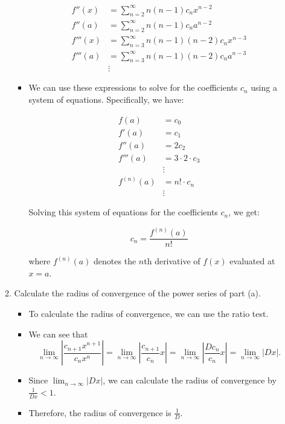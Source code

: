 \documentclass[12pt]{article}
\begin{document}
\begin{enumerate}[leftmargin=\labelsep]
\begin{enumerate}
\begin{itemize}[label={}]
            \begin{align*}
            f''(x) &= \sum_{n=2}^{\infty} n(n-1) c_n x^{n-2} \\
            f''(a) &= \sum_{n=2}^{\infty} n(n-1) c_n a^{n-2} \\
            f'''(x) &= \sum_{n=3}^{\infty} n(n-1)(n-2) c_n x^{n-3} \\
            f'''(a) &= \sum_{n=3}^{\infty} n(n-1)(n-2) c_n a^{n-3} \\
            &\vdots
            \end{align*}

            \item We can use these expressions to solve for the coefficients $c_n$ using a system of equations. Specifically, we have:

            \begin{align*}
            f(a) &= c_0 \\
            f'(a) &= c_1 \\
            f''(a) &= 2c_2 \\
            f'''(a) &= 3 \cdot 2 \cdot c_3 \\
            &\vdots \\
            f^{(n)}(a) &= n! \cdot c_n \\
            &\vdots
            \end{align*}

            Solving this system of equations for the coefficients $c_n$, we get:

            \begin{equation*}
            c_n = \frac{f^{(n)}(a)}{n!}
            \end{equation*}

            where $f^{(n)}(a)$ denotes the $n$th derivative of $f(x)$ evaluated at $x=a$.
        \end{itemize}


        \item Calculate the radius of convergence of the power series of part (a).
        \begin{itemize}[label={}]
            \item To calculate the radius of convergence, we can use the ratio test. 
            \item We can see that
            \begin{equation*}
                \lim_{n \to \infty} \left| \frac{c_{n+1} x^{n+1}}{c_n x^n} \right| = \lim_{n \to \infty} \left| \frac{c_{n+1}}{c_n} x \right| = \lim_{n \to \infty} \left| \frac{D c_n}{c_n} x \right| = \lim_{n \to \infty} \left| D x \right|.
            \end{equation*}
            \item Since $\displaystyle{\lim_{n \to \infty} \left| D x \right|}$, we can calculate the radius of convergence by $\displaystyle{\frac{1}{D x} < 1}$. 
            \item Therefore, the radius of convergence is $\displaystyle{\frac{1}{D}}$.
        \end{itemize}


\end{enumerate}
\end{enumerate}
\end{document}
